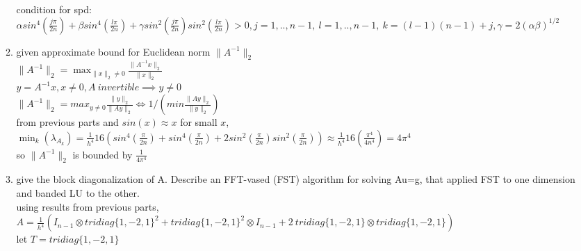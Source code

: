 \documentclass[12pt,letter]{article}
\begin{document}
\begin{enumerate}
\begin{enumerate}
    condition for spd:\\
    $\alpha sin^4(\frac{j \pi}{2n}) + \beta sin^4(\frac{l \pi}{2n}) + \gamma  sin^2(\frac{j \pi}{2n})sin^2(\frac{l \pi}{2n})>0,  j=1,..,n-1,\ l=1,..,n-1,\ k=(l-1)(n-1)+j, \gamma = 2 (\alpha \beta)^{1/2}$\\
    \pagebreak
    
  \item given approximate bound for Euclidean norm $\|A^{-1}\|_2$\\
    $\|A^{-1}\|_2=\max_{\|x\|_2 \neq 0} \frac{\|A^{-1}x\|_2}{\|x\|_2}$\\
    $y=A^{-1}x, x \neq 0, A\ invertible \implies y \neq 0$\\
    $\|A^{-1}\|_2=max_{y \neq 0} \frac{\|y\|_2}{\|Ay\|_2} \Longleftrightarrow 1/(min\frac{\|Ay\|_2}{\|y\|_2}) $\\

    
    from previous parts and $sin(x) \approx x$ for small $x$, \\
    $\min_k(\lambda_{A_k}) =\frac{1}{h^4}16(sin^4(\frac{\pi}{2n}) +sin^4(\frac{\pi}{2n}) +2 sin^2(\frac{\pi}{2n})sin^2(\frac{\pi}{2n})) \approx \frac{1}{h^4}16(\frac{\pi^4}{4n^4})=4 \pi^4$\\
    so $\|A^{-1}\|_2$ is bounded by $\frac{1}{4 \pi^4}$\\
    
  \item give the block diagonalization of A. Describe an FFT-vased (FST) algorithm for solving Au=g, that applied FST to one dimension and banded LU to the other.\\

    using results from previous parts,\\
    
    $A=\frac{1}{h^4}(I_{n-1} \otimes tridiag\{1,-2,1\}^2 + tridiag\{1,-2,1\}^2 \otimes I_{n-1}+
    2\ tridiag\{1,-2,1\} \otimes tridiag\{1,-2,1\})$\\

    let $T=tridiag\{1,-2,1\}$\\


\end{enumerate}
\end{enumerate}
\end{document}
